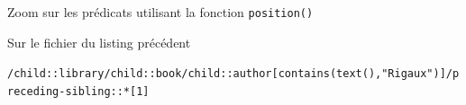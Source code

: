 \begin{frame}{Zoom sur les pr\'edicats utilisant la fonction \texttt{position()}}
\begin{tiny}
\begin{exampleblock}{Sur le fichier du listing pr\'ec\'edent}

\verb?/child::library/child::book/child::author[contains(text(),"Rigaux")]/preceding-sibling::*[1] ?


\end{exampleblock}
\end{tiny}

\end{frame}


